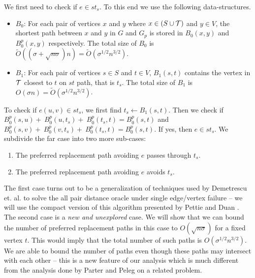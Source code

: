 We first need to check if $e \in st_s$. To this end we use the following data-structures.
\begin{itemize}[leftmargin=*,noitemsep,nolistsep]
\item $B_0$: For each pair of vertices $x$ and $y$ where $x
\in (S \cup \mathcal{T})$ and $y \in V$, the shortest
path between $x$ and $y$ in $G$ and $G_p$ is stored in $B_0(x,y)$ and $B_0^p(x,y)$ respectively.  The total
size of $B_0$ is $\tilde O((\sigma +\sqrt{n\sigma}) n) = \tilde O(\sigma^{1/2} n^{3/2})$.


\item $B_1$: For each pair of vertices $s \in S$ and $t \in V$, $B_1(s,t)$ contains the
vertex in $\mathcal{T}$ closest to $t$ on $st$ path, that is $t_s$.  The total size of
$B_1$ is $ O(\sigma n) = \tilde O(\sigma^{1/2}n^{3/2})$.
\end{itemize}

\noindent %
To check if $e(u,v) \in st_s$, we first find $t_s \leftarrow B_1(s,t)$.
Then we check if $B_0^{p}(s,u) +\ B_0^{p}(u,t_s) +\ B_0^{p}(t_s,t) = B_0^{p}(s,t)$ and $B_0^{p}(s,v) +\ B_0^{p}(v,t_s) +\ B_0^{p}(t_s,t)
= B_0^{p}(s,t)$.
If yes, then $e \in st_s$.
 We subdivide the far case into two more sub-cases:
\begin{enumerate}
   \item The preferred replacement path  avoiding $e$ passes through $t_s$.

   \item The preferred replacement path avoiding $e$ avoids $t_s$.

\end{enumerate}

\noindent  The first case turns out to be a generalization of techniques
used by Demetrescu et. al.\cite{DemetrescuTCR08}  to solve the all pair distance oracle
under single edge/vertex failure -- we will
use the compact version of this algorithm presented by
Pettie and Duan \cite{DuanP09}. The second case is a {\em new and unexplored}
case. We will show that we
can bound the number of preferred replacement paths in this case to $O(\sqrt{n \sigma})$ for a fixed vertex $t$.
This would imply that the total number of such paths is $O(\sigma^{1/2}n^{3/2})$. We are able to
bound the number of paths even though these paths may intersect with each other --  this
is a new feature of our analysis which is much different from the analysis done by
Parter and Peleg \cite{ParterP13} on a related problem.

